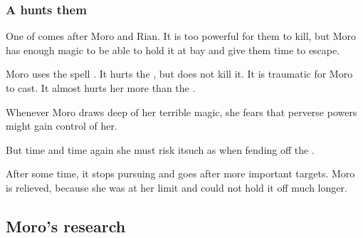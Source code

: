 \subsubsection{A \bane hunts them}
One of  comes after Moro and Rian. It is too powerful for them to kill, but Moro has enough magic to be able to hold it at bay and give them time to escape. 

Moro uses the spell . 
It hurts the \bane, but does not kill it. 
It is traumatic for Moro to cast. 
It almost hurts her more than the \bane. 

Whenever Moro draws deep of her terrible magic, she fears that perverse powers might gain control of her. 


But time and time again she must risk it\dash such as when fending off the \bane. 


After some time, it stops pursuing and goes after more important targets. Moro is relieved, because she was at her limit and could not hold it off much longer. 











\subsection{Moro's research}






